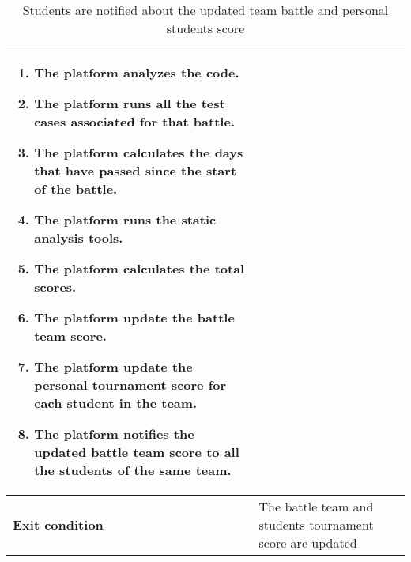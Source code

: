 \begin{enumerate}[label=\textbf{UC\arabic*}:,leftmargin=1.3cm]
\begin{table}[H]
\begin{tabular}{|l|p{11.9cm}|}
\begin{enumerate}[label=\arabic*.]
                              \item The platform analyzes the code.
                              \item The platform runs all the test cases associated for that battle.
                              \item The platform calculates the days that have passed since the start of the battle.
                              \item The platform runs the static analysis tools.
                              \item The platform calculates the total scores.
                              \item The platform update the battle team score.
                              \item The platform update the personal tournament score for each student in the team.
                              \item The platform notifies the updated battle team score to all the students of the same team.
                        \end{enumerate}                                                       \\\hline
                        \textbf{Exit condition}  & The battle team and students tournament score are updated                                                                                    \\\hline
                  \end{tabular}
                  \caption{Students are notified about the updated team battle and personal students score}
                  \label{table:Students are notified about the updated team battle and personal students score}
            \end{table}


\end{enumerate}
